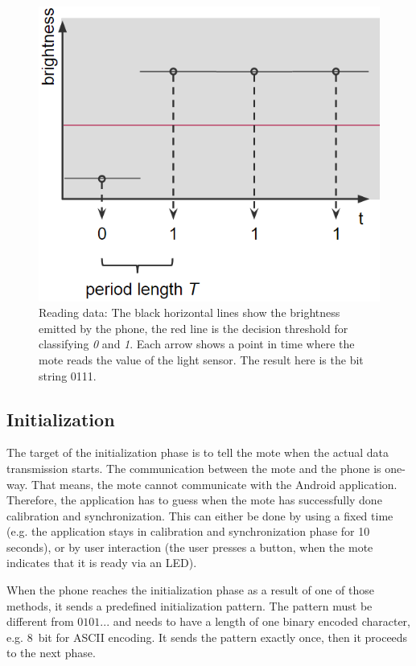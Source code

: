 \documentclass{sig-alternate} %
\begin{document}
\begin{figure}
	\centering
	\includegraphics[scale=.5]{images/reading_data.png}
	\caption{Reading data: The black horizontal lines show the brightness emitted by the phone, the red line is the decision threshold for classifying \textit{0} and \textit{1}. Each arrow shows a point in time where the mote reads the value of the light sensor. The result here is the bit string 0111.}
	\label{fig:read_a_bit}
\end{figure}

\subsection{Initialization}
\label{sub:initialization}

The target of the initialization phase is to tell the mote when the actual data transmission starts.
The communication between the mote and the phone is one-way.
That means, the mote cannot communicate with the Android application.
Therefore, the application has to guess when the mote has successfully done calibration and synchronization.
This can either be done by using a fixed time (e.g. the application stays in calibration and synchronization phase for 10 seconds), or by user interaction (the user presses a button, when the mote indicates that it is ready via an LED).

When the phone reaches the initialization phase as a result of one of those methods, it sends a predefined initialization pattern.
The pattern must be different from $0101...$ and needs to have a length of one binary encoded character, e.g. 8~bit for ASCII encoding.
It sends the pattern exactly once, then it proceeds to the next phase.
\end{document}
